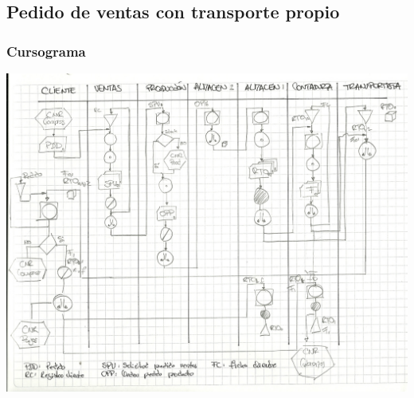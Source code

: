 \subsection{Pedido de ventas con transporte propio}

\subsubsection{Cursograma}
\includegraphics [angle=90]{Empresa/Circuitos/ventas.jpg}

\pagebreak

